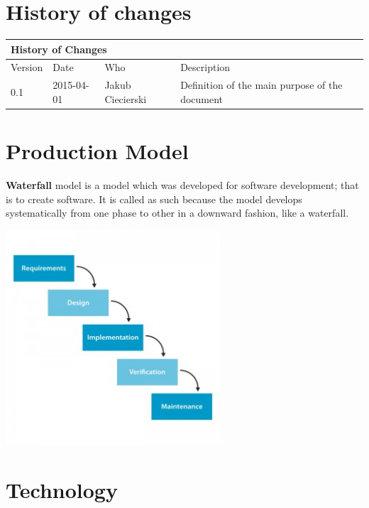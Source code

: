 \documentclass{article}
\begin{document}
\section{History of changes}

	\begin{table}[h]
		\hspace*{-2.1cm}
		\large
		\begin{tabular}{|l|l|l|l|}
		\hline
		\multicolumn{4}{|l|}{\cellcolor[HTML]{C0C0C0}History of Changes} \\ \hline
		Version         & Date         & Who        & Description        \\ \hline
		0.1         & 2015-04-01         & Jakub Ciecierski        & Definition of the main purpose of the document       \\ \hline
		\end{tabular}
	\end{table}

\newpage


\section{Production Model}
{\bf Waterfall} model is a model which was developed for software development; that is to create software. It is called as such because the model develops systematically from one phase to other in a downward fashion, like a waterfall.

\includegraphics[width=80mm]{images/waterfall_model.jpg} \\

\section{Technology}
\end{document}

